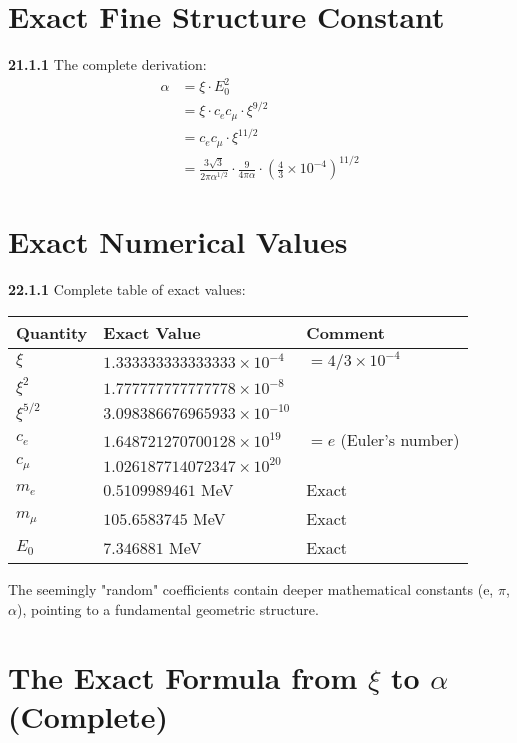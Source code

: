 \documentclass[12pt,a4paper]{article}
\begin{document}
\section{Exact Fine Structure Constant}
\noindent \textbf{21.1.1} The complete derivation:
\begin{align}
	\alpha &= \xi \cdot E_0^2 \\
	&= \xi \cdot c_e c_\mu \cdot \xi^{9/2} \\
	&= c_e c_\mu \cdot \xi^{11/2} \\
	&= \frac{3\sqrt{3}}{2\pi\alpha^{1/2}} \cdot \frac{9}{4\pi\alpha} \cdot \left(\frac{4}{3} \times 10^{-4}\right)^{11/2}
\end{align}

\section{Exact Numerical Values}

\noindent \textbf{22.1.1} Complete table of exact values:

\begin{table}[h]
	\centering
	\begin{tabular}{lll}
		\toprule
		Quantity & Exact Value & Comment \\
		\midrule
		$\xi$ & $1.333333333333333 \times 10^{-4}$ & $= 4/3 \times 10^{-4}$ \\
		$\xi^2$ & $1.777777777777778 \times 10^{-8}$ & \\
		$\xi^{5/2}$ & $3.098386676965933 \times 10^{-10}$ & \\
		$c_e$ & $1.648721270700128 \times 10^{19}$ & $= e$ (Euler's number) \\
		$c_\mu$ & $1.026187714072347 \times 10^{20}$ & \\
		$m_e$ & $0.5109989461$ MeV & Exact \\
		$m_\mu$ & $105.6583745$ MeV & Exact \\
		$E_0$ & $7.346881$ MeV & Exact \\
		\bottomrule
	\end{tabular}
\end{table}

The seemingly "random" coefficients contain deeper mathematical constants (e, $\pi$, $\alpha$), pointing to a fundamental geometric structure.
\section{The Exact Formula from $\xi$ to $\alpha$ (Complete)}
\end{document}
